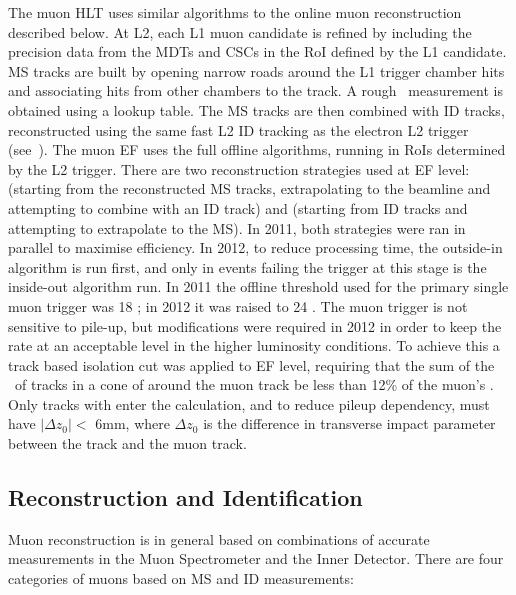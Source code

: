 The muon HLT uses similar algorithms to the online muon reconstruction described
below. At L2, each L1 muon candidate is refined by including the precision data
from the MDTs and CSCs in the RoI defined by the L1 candidate. MS tracks are
built by opening narrow roads around the L1 trigger chamber hits and associating
hits from other chambers to the track. A rough \pt\ measurement is obtained
using a lookup table. The MS tracks are then combined with ID tracks,
reconstructed using the same fast L2 ID tracking as the electron L2 trigger
(see~). The muon EF uses the full offline algorithms,
running in RoIs determined by the L2 trigger. There are two reconstruction
strategies used at EF level:  (starting from the reconstructed
MS tracks, extrapolating to the beamline and attempting to combine with an ID
track) and  (starting from ID tracks and attempting to
extrapolate to the MS). In 2011, both strategies were ran in parallel to
maximise efficiency. In 2012, to reduce processing time, the outside-in
algorithm is run first, and only in events failing the trigger at this stage is
the inside-out algorithm run. In 2011 the offline threshold used for the primary
single muon trigger was 18 \GeV; in 2012 it was raised to 24 \GeV. The muon
trigger is not sensitive to pile-up, but modifications were required in 2012 in
order to keep the rate at an acceptable level in the higher luminosity
conditions. To achieve this a track based isolation cut was applied to EF level,
requiring that the sum of the \pt\ of tracks in a cone of  around
the muon track be less than 12\% of the muon's \pt. Only tracks with 
enter the calculation, and to reduce pileup dependency, must have $|\Delta
z_{0}| <$ 6mm, where $\Delta z_{0}$ is the difference in transverse impact
parameter between the track and the muon track.

\subsection{Reconstruction and Identification}
\label{sec:reco-el-reco}

Muon reconstruction is in general based on combinations of accurate measurements
in the Muon Spectrometer and the Inner Detector. There are four categories of
muons based on MS and ID measurements:

